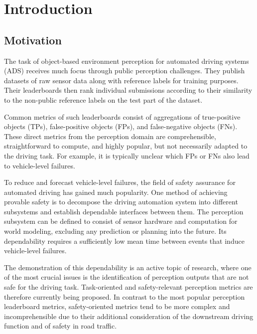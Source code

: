 \documentclass[conference]{IEEEtran}
\begin{document}


\section{Introduction}
\label{sec:introduction}

\subsection{Motivation}

The task of object-based environment perception for automated driving systems (ADS) receives much focus through public perception challenges. %
They publish datasets of raw sensor data along with reference labels for training purposes. 
Their leaderboards then rank individual submissions according to their similarity to the non-public reference labels on the test part of the dataset.

Common metrics of such leaderboards consist of aggregations of true-positive objects (TPs), false-positive objects (FPs), and false-negative objects (FNs). 
These direct metrics from the perception domain are comprehensible, straightforward to compute, and highly popular, but not necessarily adapted to the driving task. 
For example, it is typically unclear which FPs or FNs also lead to vehicle-level failures. 

To reduce and forecast vehicle-level failures, the field of safety assurance for automated driving has gained much popularity. 
One method of achieving provable safety is to decompose the driving automation system into different subsystems and establish dependable interfaces between them. 
The perception subsystem can be defined to consist of sensor hardware and computation for world modeling, excluding any prediction or planning into the future. 
Its dependability requires a sufficiently low mean time between events that induce vehicle-level failures. 


The demonstration of this dependability is an active topic of research, where one of the most crucial issues is the identification of perception outputs that are not safe for the driving task. 
Task-oriented and safety-relevant perception metrics are therefore currently being proposed. 
In contrast to the most popular perception leaderboard metrics, safety-oriented metrics tend to be more complex and incomprehensible due to their additional consideration of the downstream driving function and of safety in road traffic. 
\end{document}

